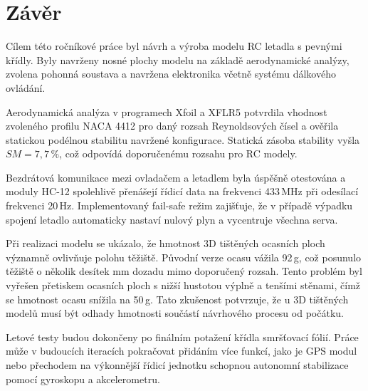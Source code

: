 \documentclass[12pt, a4paper, oneside]{report}
\begin{document}
\clearpage
\chapter*{Závěr}

Cílem této ročníkové práce byl návrh a výroba modelu RC letadla s pevnými 
křídly. Byly navrženy nosné plochy modelu na základě aerodynamické analýzy, 
zvolena pohonná soustava a navržena elektronika včetně systému dálkového 
ovládání.

Aerodynamická analýza v programech Xfoil a XFLR5 potvrdila vhodnost zvoleného 
profilu NACA 4412 pro daný rozsah Reynoldsových čísel a ověřila statickou 
podélnou stabilitu navržené konfigurace. Statická zásoba stability vyšla 
$SM = 7{,}7\,\%$, což odpovídá doporučenému rozsahu pro RC modely. 

Bezdrátová komunikace mezi ovladačem a letadlem byla úspěšně otestována 
a moduly HC-12 spolehlivě přenášejí řídicí data na frekvenci 433\,MHz při 
odesílací frekvenci 20\,Hz. Implementovaný fail-safe režim zajišťuje, že 
v případě výpadku spojení letadlo automaticky nastaví nulový plyn a vycentruje 
všechna serva.

Při realizaci modelu se ukázalo, že hmotnost 3D tištěných ocasních ploch 
významně ovlivňuje polohu těžiště. Původní verze ocasu vážila 92\,g, což 
posunulo těžiště o několik desítek mm dozadu mimo doporučený rozsah. Tento problém byl 
vyřešen přetiskem ocasních ploch s nižší hustotou výplně a tenšími stěnami, čímž se hmotnost ocasu snížila na 50\,g. 
Tato zkušenost potvrzuje, že u 3D tištěných modelů musí být odhady hmotnosti součástí návrhového procesu 
od počátku.

Letové testy budou dokončeny po finálním potažení křídla smršťovací fólií.
 Práce může v budoucích iteracích pokračovat přidáním více funkcí, jako je GPS modul nebo přechodem na výkonnější řídicí jednotku 
schopnou autonomní stabilizace pomocí gyroskopu a akcelerometru.
\end{document}
